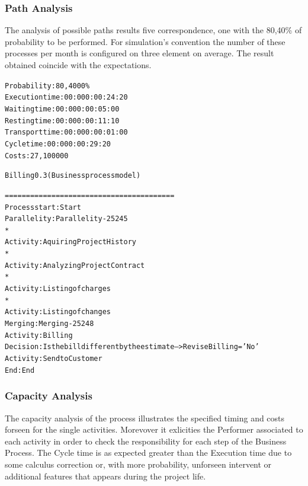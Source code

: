 \subsubsection{Path Analysis}
The analysis of possible paths results five correspondence, one with the 80,40\% of probability to be performed. For simulation's convention the number of these processes per month is configured on three element on average. The result obtained coincide with the expectations.

\begin{alltt}
Probability:   80,4000\%
Execution time:  00:000:00:24:20
Waiting time:  00:000:00:05:00
Resting time:  00:000:00:11:10
Transport time:  00:000:00:01:00
Cycle time:  00:000:00:29:20
Costs:  27,100000

Billing 0.3 (Business process model)

========================================
Process start: Start
Parallelity: Parallelity-25245
    *
    Activity: Aquiring Project History
    *
    Activity: Analyzing Project Contract
    *
    Activity: Listing of charges
    *
    Activity: Listing of changes
Merging: Merging-25248
Activity: Billing
Decision: Is the bill different by the estimate --> ReviseBilling = 'No'
Activity: Send to Customer
End: End
\end{alltt}


\subsubsection{Capacity Analysis}
The capacity analysis of the process illustrates the specified timing and costs forseen for the single activities. Morevover it exlicities the Performer associated to each activity in order to check the responsibility for each step of the Business Process. The Cycle time is as expected greater than the Execution time due to some calculus correction or, with more probability, unforseen intervent or additional features that appears during the project life.

